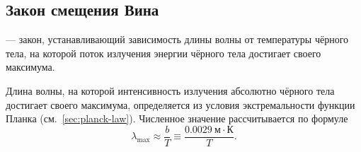 \subsection{Закон смещения Вина}
 --- закон, устанавливающий зависимость длины волны от температуры чёрного тела, на которой поток излучения энергии чёрного тела достигает своего максимума.

Длина волны, на которой интенсивность излучения абсолютно чёрного тела достигает своего максимума, определяется из условия экстремальности функции Планка (см.~\ref{sec:planck-law}). Численное значение рассчитывается по формуле
\begin{equation}
\lambda_\text{max} \approx \frac{b}{T} \equiv \frac{0.0029~\text{м} \cdot \text{К}}{T}.
\end{equation}